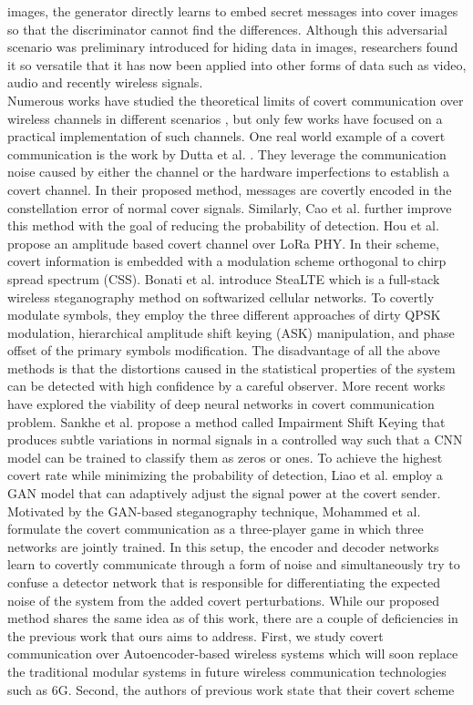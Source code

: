images, the generator directly learns to embed secret messages into cover images so that the discriminator cannot find the differences. Although this adversarial scenario was preliminary introduced for hiding data in images, researchers found it so versatile that it has now been applied into other forms of data such as video, audio and recently wireless signals.\\
Numerous works have studied the theoretical limits of covert communication over wireless channels in different scenarios \cite{bash2012square, soltani2018covert, sheikholeslami2018multi, li2021fundamental}, but only few works have focused on a practical implementation of such channels. One real world example of a covert communication is the work by Dutta et al. \cite{dutta2012secret}. They leverage the communication noise caused by either the channel or the hardware imperfections to establish a covert channel. In their proposed method, messages are covertly encoded in the constellation error of normal cover signals. Similarly, Cao et al. \cite{cao2018wireless} further improve this method with the goal of reducing the probability of detection. Hou et al. \cite{hou2020cloaklora} propose an amplitude based covert channel over LoRa PHY. In their scheme, covert information is embedded with a modulation scheme orthogonal to chirp spread spectrum (CSS). Bonati et al. \cite{bonati2021stealte} introduce SteaLTE which is a full-stack wireless steganography method on softwarized cellular networks. To covertly modulate symbols, they employ the three different approaches of dirty QPSK modulation, hierarchical amplitude shift keying (ASK) manipulation, and phase offset of the primary symbols modification. The disadvantage of all the above methods is that the distortions caused in the statistical properties of the system can be detected with high confidence by a careful observer. More recent works have explored the viability of deep neural networks in covert communication problem. Sankhe et al. \cite{sankhe2019impairment} propose a method called Impairment Shift Keying that produces subtle variations in normal signals in a controlled way such that a CNN model can be trained to classify them as zeros or ones. To achieve the highest covert rate while minimizing the probability of detection, Liao et al. \cite{liao2020generative} employ a GAN model that can adaptively adjust the signal power at the covert sender. Motivated by the GAN-based steganography technique, Mohammed et al. \cite{mohammed2021adversarial} formulate the covert communication as a three-player game in which three networks are jointly trained. In this setup, the encoder and decoder networks learn to covertly communicate through a form of noise and simultaneously try to confuse a detector network that is responsible for differentiating the expected noise of the system from the added covert perturbations. While our proposed method shares the same idea as of this work, there are a couple of deficiencies in the previous work that ours aims to address. First, we study covert communication over Autoencoder-based wireless systems which will soon replace the traditional modular systems in future wireless communication technologies such as 6G. Second, the authors of previous work state that their covert scheme 